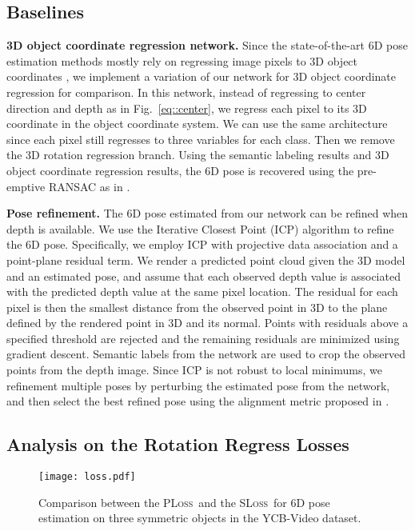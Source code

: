 \documentclass[conference]{IEEEtran}
\newcommand{\sloss}{\textsc{SLoss}}
\newcommand{\pl}{\textsc{PLoss}}
\begin{document}
\subsection{Baselines}

\textbf{3D object coordinate regression network.} Since the state-of-the-art 6D pose estimation methods mostly rely on regressing image pixels to 3D object coordinates \cite{brachmann2014learning,brachmann2016uncertainty,michel2016global}, we implement a variation of our network for 3D object coordinate regression for comparison. In this network, instead of regressing to center direction and depth as in Fig.~\ref{eq::center}, we regress each pixel to its 3D coordinate in the object coordinate system. We can use the same architecture since each pixel still regresses to three variables for each class. Then we remove the 3D rotation regression branch. Using the semantic labeling results and 3D object coordinate regression results, the 6D pose is recovered using the pre-emptive RANSAC as in \cite{brachmann2016uncertainty}.

\textbf{Pose refinement.} The 6D pose estimated from our network can be refined when depth is available. We use the Iterative Closest Point (ICP) algorithm to refine the 6D pose. Specifically, we employ ICP with projective data association and a point-plane residual term. We render a predicted point cloud given the 3D model and an estimated pose, and assume that each observed depth value is associated with the predicted depth value at the same pixel location. The residual for each pixel is then the smallest distance from the observed point in 3D to the plane defined by the rendered point in 3D and its normal. Points with residuals above a specified threshold are rejected and the remaining residuals are minimized using gradient descent. Semantic labels from the network are used to crop the observed points from the depth image. Since ICP is not robust to local minimums, we refinement multiple poses by perturbing the estimated pose from the network, and then select the best refined pose using the alignment metric proposed in \cite{wong2017segicp}.




\subsection{Analysis on the Rotation Regress Losses}


\begin{figure}
	\centering
	\texttt{[image: loss.pdf]}
	\caption{Comparison between the \pl\ and the \sloss\ for 6D pose estimation on three symmetric objects in the YCB-Video dataset.}
	\label{fig:loss}
	\vspace{-6mm}
\end{figure}
\end{document}
